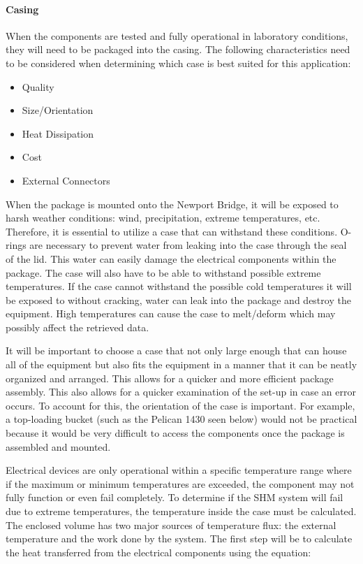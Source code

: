 \paragraph{Casing}

When the components are tested and fully operational in laboratory conditions, they will need to be packaged into the casing. The following
characteristics need to be considered when determining which case is best suited for this application:

\begin{itemize}
\item {Quality} 
\item {Size/Orientation}
\item {Heat Dissipation} 
\item {Cost} 
\item {External Connectors}
\end{itemize}


When the package is mounted onto the Newport Bridge, it will be exposed to harsh weather conditions: wind, precipitation, extreme temperatures,
etc. Therefore, it is essential to utilize a case that can withstand these conditions. O-rings are necessary to prevent water from leaking into
the case through the seal of the lid. This water can easily damage the electrical components within the package. The case will also have to be able to
withstand possible extreme temperatures. If the case cannot withstand the possible cold temperatures it will be exposed to without cracking, water can
leak into the package and destroy the equipment. High temperatures can cause the case to melt/deform which may possibly affect the retrieved data. 

It will be important to choose a case that not only large enough that can house all of the equipment but also fits the equipment in a manner that it can
be neatly organized and arranged. This allows for a quicker and more efficient package assembly. This also allows for a quicker examination of the
set-up in case an error occurs. To account for this, the orientation of the case is important. For example, a top-loading bucket (such as the Pelican
1430 seen below) would not be practical because it would be very difficult to access the components once the package is assembled and mounted.  



Electrical devices are only operational within a specific temperature range where if the maximum or minimum temperatures are exceeded, the component may
not fully function or even fail completely. To determine if the SHM system will fail due to extreme temperatures, the temperature inside the case must
be calculated. The enclosed volume has two major sources of temperature flux: the external temperature and the work done by the system. The first step
will be to calculate the heat transferred from the electrical components using the equation:

